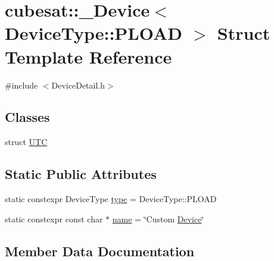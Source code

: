 \hypertarget{structcubesat_1_1__Device_3_01DeviceType_1_1PLOAD_01_4}{}\section{cubesat\+:\+:\+\_\+\+Device$<$ Device\+Type\+:\+:P\+L\+O\+AD $>$ Struct Template Reference}
\label{structcubesat_1_1__Device_3_01DeviceType_1_1PLOAD_01_4}


{\ttfamily \#include $<$Device\+Detail.\+h$>$}

\subsection*{Classes}
\begin{DoxyCompactItemize}
\item 
struct \hyperlink{structcubesat_1_1__Device_3_01DeviceType_1_1PLOAD_01_4_1_1UTC}{U\+TC}
\end{DoxyCompactItemize}
\subsection*{Static Public Attributes}
\begin{DoxyCompactItemize}
\item 
static constexpr Device\+Type \hyperlink{structcubesat_1_1__Device_3_01DeviceType_1_1PLOAD_01_4_a69eec0aaebcde656b579781fde78f1cd}{type} = Device\+Type\+::\+P\+L\+O\+AD
\item 
static constexpr const char $\ast$ \hyperlink{structcubesat_1_1__Device_3_01DeviceType_1_1PLOAD_01_4_a7fe180abd4800878af3a697558473715}{name} = \char`\"{}Custom \hyperlink{classcubesat_1_1Device}{Device}\char`\"{}
\end{DoxyCompactItemize}


\subsection{Member Data Documentation}
\mbox{\label{structcubesat_1_1__Device_3_01DeviceType_1_1PLOAD_01_4_a7fe180abd4800878af3a697558473715}} 
